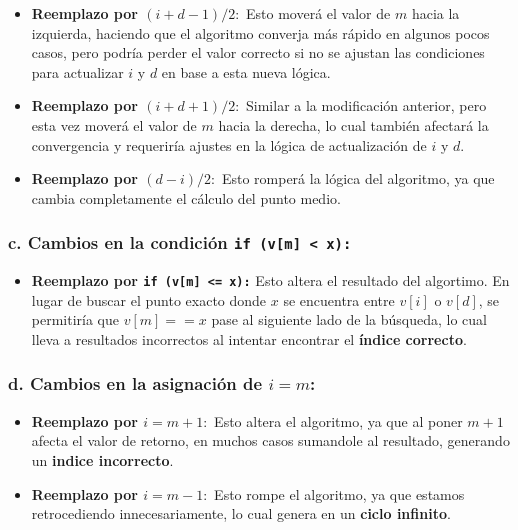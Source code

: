 \documentclass{article}
\begin{document}
            \begin{itemize}
                \item \textbf{Reemplazo por \((i + d - 1)/2:\)} Esto moverá el valor de \( m \) hacia la izquierda, haciendo que el algoritmo converja más rápido en algunos pocos casos, pero podría perder el valor correcto si no se ajustan las condiciones para actualizar \( i \) y \( d \) en base a esta nueva lógica.
                
                \item \textbf{Reemplazo por \((i + d + 1)/2:\)} Similar a la modificación anterior, pero esta vez moverá el valor de \( m \)  hacia la derecha, lo cual también afectará la convergencia y requeriría ajustes en la lógica de actualización de \( i \) y \( d \).
                
                \item \textbf{Reemplazo por \((d - i)/2:\)} Esto romperá la lógica del algoritmo, ya que cambia completamente el cálculo del punto medio.
            \end{itemize}
            
        \subsubsection*{c. Cambios en la condición \texttt{if (v[m] < x):}}
            
            \begin{itemize}
                \item \textbf{Reemplazo por \texttt{if (v[m] <= x):}} Esto altera el resultado del algortimo. En lugar de buscar el punto exacto donde \( x \) se encuentra entre \( v[i] \) o \( v[d] \), se permitiría que \( v[m] == x \) pase al siguiente lado de la búsqueda, lo cual lleva a resultados incorrectos al intentar encontrar el \textbf{índice correcto}.
            \end{itemize}
            
        \subsubsection*{d. Cambios en la asignación de \( i = m \):}
            
            \begin{itemize}
                \item \textbf{Reemplazo por \( i = m+1:\)} Esto altera el algoritmo, ya que al poner \( m+1 \) afecta el valor de retorno, en muchos casos sumandole al resultado, generando un \textbf{indice incorrecto}.
                
                \item \textbf{Reemplazo por \( i = m-1:\)} Esto rompe el algoritmo, ya que estamos retrocediendo innecesariamente, lo cual genera en un \textbf{ciclo infinito}.
            \end{itemize}
            
\end{document}
